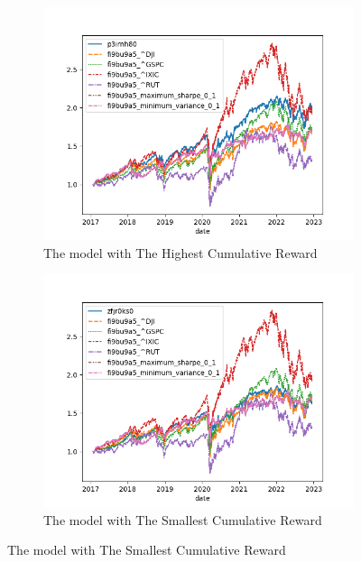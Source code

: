 \documentclass[../xlapes02]{subfiles}
\begin{document}
    \begin{figure}[h!]
        \centering
        \begin{subfigure}[t]{\experimentimgwidth\textwidth}
            \centering
            \includegraphics[width=\linewidth]{image/figure/returns_max}
            \caption{The model with The Highest Cumulative Reward}
            \label{fig:returns_max}
        \end{subfigure}
        \hfill
        \begin{subfigure}[t]{\experimentimgwidth\textwidth}
            \centering
            \includegraphics[width=\linewidth]{image/figure/returns_min}
            \caption{The model with The Smallest Cumulative Reward}
            \label{fig:returns_min}

\end{subfigure}
\end{figure}
\end{document}
